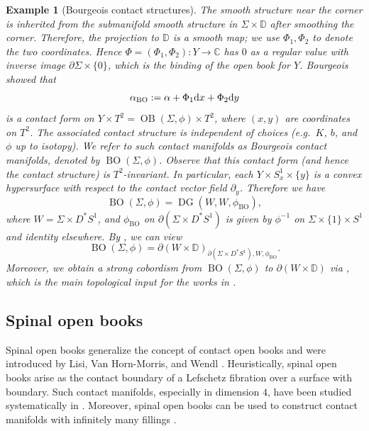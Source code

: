 \documentclass[11pt]{amsart}
\numberwithin{equation}{section}
\newtheorem{example}[theorem]{\textbf{Example}}
\def\C{{\mathbb C}}
\def\D{{\mathbb D}}
\def\rd{{\rm d}}
\DeclareMathOperator{\BO}{BO}
\DeclareMathOperator{\Openbook}{OB}
\DeclareMathOperator{\DG}{DG}
\begin{document}
\begin{example}[Bourgeois contact structures]
The smooth structure near the corner is inherited from the submanifold smooth structure in $\Sigma \times \D$ after smoothing the corner. Therefore, the projection to $\D$ is a smooth map; we use $\Phi_1,\Phi_2$ to denote the two coordinates. Hence $\Phi=(\Phi_{1}, \Phi_{2}): Y \rightarrow \C$ has $0$ as a regular value with inverse image $\partial \Sigma \times \{0\}$, which is the binding of the open book for $Y$. Bourgeois \cite{Bourgeois02} showed that 
$$\alpha_{\mathrm{BO}} := \alpha + \Phi_1 \rd x + \Phi_2 \rd y$$
is a contact form on $Y \times T^2= \Openbook(\Sigma,\phi)\times T^2$, where $(x,y)$ are coordinates on $T^2$. The associated contact structure is independent of choices (e.g.\ $K$, $b$, and $\phi$ up to isotopy). We refer to such contact manifolds as \emph{Bourgeois contact manifolds}, denoted by $\BO(\Sigma,\phi)$. Observe that this contact form (and hence the contact structure) is $T^2$-invariant. In particular, each $Y \times S^1_{x}\times \{y\}$ is a convex hypersurface with respect to the contact vector field $\partial_{y}$. Therefore we have \cite[Proposition 2.6]{AZ}
$$\BO(\Sigma,\phi)=\DG(W, W,\phi_{\BO}),$$
where $W=\Sigma \times D^*S^1$, and $\phi_{\BO}$ on $\partial(\Sigma \times D^*S^1)$ is given by $\phi^{-1}$ on $\Sigma \times \{1\}\times S^1$ and identity elsewhere. By , we can view
$$\BO(\Sigma,\phi)=\partial (W\times \D)_{\partial(\Sigma \times D^*S^1), W, \phi_{\BO}}.$$
Moreover, we obtain a strong cobordism from $\BO(\Sigma,\phi)$ to $\partial (W\times \D)$ via , which is the main topological input for the works in \cite{BGM,bowden2022tight}.
\end{example}


\subsection{Spinal open books}
Spinal open books generalize the concept of contact open books and were introduced by Lisi, Van Horn-Morris, and Wendl \cite{lisi2018symplectic}. Heuristically, spinal open books arise as the contact boundary of a Lefschetz fibration over a surface with boundary. Such contact manifolds, especially in dimension $4$, have been studied systematically in \cite{lisi2018symplectic,lisi2020symplectic,MR4278702, arXiv:2410.10697}. Moreover, spinal open books can be used to construct contact manifolds with infinitely many fillings \cite{zbMATH06537657,zhou2023note}. 
\end{document}
